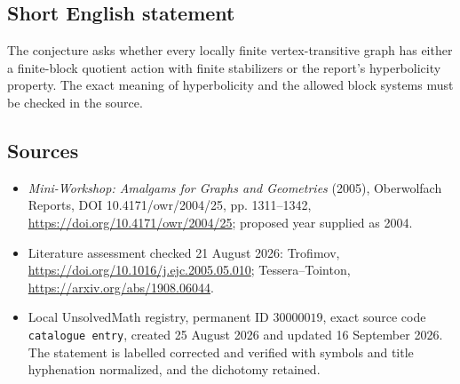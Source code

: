 \documentclass[11pt]{article}
\begin{document}
\subsection{Short English statement}
The conjecture asks whether every locally finite vertex-transitive graph has either a finite-block quotient action with finite stabilizers or the report's hyperbolicity property. The exact meaning of hyperbolicity and the allowed block systems must be checked in the source.
\subsection{Sources}
\begin{itemize}
\item \emph{Mini-Workshop: Amalgams for Graphs and Geometries} (2005), Oberwolfach Reports, DOI 10.4171/owr/2004/25, pp. 1311--1342, \url{https://doi.org/10.4171/owr/2004/25}; proposed year supplied as 2004.
\item Literature assessment checked 21 August 2026: Trofimov, \url{https://doi.org/10.1016/j.ejc.2005.05.010}; Tessera--Tointon, \url{https://arxiv.org/abs/1908.06044}.
\item Local UnsolvedMath registry, permanent ID $30000019$, exact source code \texttt{catalogue entry}, created 25 August 2026 and updated 16 September 2026. The statement is labelled corrected and verified with symbols and title hyphenation normalized, and the dichotomy retained.
\end{itemize}
\end{document}
